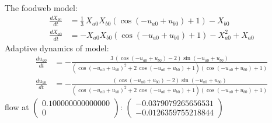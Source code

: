 \documentclass{article}
\begin{document}
The foodweb model:
\[\begin{align*}
\frac{dX_{ b 0 }}{dt} &= \frac{1}{3} \, X_{ a 0 } X_{ b 0 } {\left(\cos\left(-u_{ a 0 } + u_{ b 0 }\right) + 1\right)} - X_{ b 0 }\\
\frac{dX_{ a 0 }}{dt} &= -X_{ a 0 } X_{ b 0 } {\left(\cos\left(-u_{ a 0 } + u_{ b 0 }\right) + 1\right)} - X_{ a 0 }^{2} + X_{ a 0 }
\end{align*}\]
Adaptive dynamics of model:
\begin{align*}
\frac{du_{ a 0 }}{dt} &= -\frac{3 \, {\left(\cos\left(-u_{ a 0 } + u_{ b 0 }\right) - 2\right)} \sin\left(-u_{ a 0 } + u_{ b 0 }\right)}{{\left(\cos\left(-u_{ a 0 } + u_{ b 0 }\right)^{2} + 2 \, \cos\left(-u_{ a 0 } + u_{ b 0 }\right) + 1\right)} {\left(\cos\left(-u_{ a 0 } + u_{ b 0 }\right) + 1\right)}}\\
\frac{du_{ b 0 }}{dt} &= -\frac{{\left(\cos\left(-u_{ a 0 } + u_{ b 0 }\right) - 2\right)} \sin\left(-u_{ a 0 } + u_{ b 0 }\right)}{{\left(\cos\left(-u_{ a 0 } + u_{ b 0 }\right)^{2} + 2 \, \cos\left(-u_{ a 0 } + u_{ b 0 }\right) + 1\right)} {\left(\cos\left(-u_{ a 0 } + u_{ b 0 }\right) + 1\right)}}
\end{align*}flow at $\left(\begin{array}{c}
  0.100000000000000\\
  0
\end{array}\right)$: $\left(\begin{array}{c}
  -0.0379079265656531\\
  -0.0126359755218844
\end{array}\right)$
\end{document}
